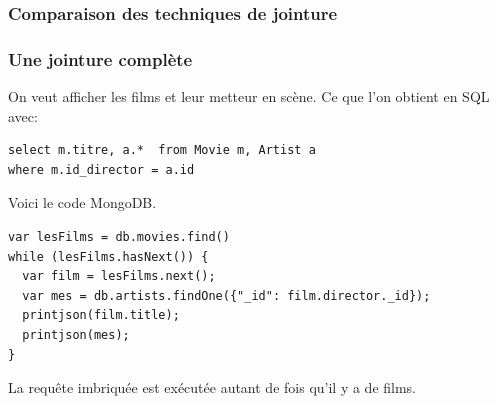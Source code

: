\begin{frame}[fragile]
\frametitle{Comparaison des techniques de jointure}



\end{frame}


\begin{frame}[fragile]
\frametitle{Une jointure complète}

On veut afficher les films et leur metteur en scène. Ce que l'on obtient en SQL avec:

\begin{verbatim}
select m.titre, a.*  from Movie m, Artist a
where m.id_director = a.id
\end{verbatim}

\vfill
Voici le code MongoDB.

\begin{verbatim}
var lesFilms = db.movies.find()
while (lesFilms.hasNext()) {
  var film = lesFilms.next();
  var mes = db.artists.findOne({"_id": film.director._id});
  printjson(film.title);
  printjson(mes);
}
\end{verbatim}

\vfill
La requête imbriquée est exécutée autant de fois qu’il y a de films.

\end{frame}
